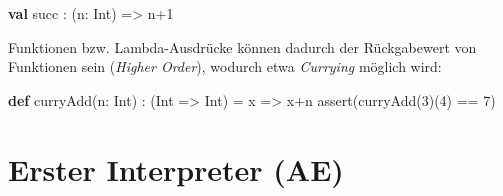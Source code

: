 \documentclass[]{article}
\newenvironment{Shaded}{}{}
\newcommand{\DecValTok}[1]{\textcolor[rgb]{0.25,0.63,0.44}{#1}}
\newcommand{\FunctionTok}[1]{\textcolor[rgb]{0.02,0.16,0.49}{#1}}
\newcommand{\KeywordTok}[1]{\textcolor[rgb]{0.00,0.44,0.13}{\textbf{#1}}}
\newcommand{\NormalTok}[1]{#1}
\begin{document}
\begin{Shaded}
\begin{Highlighting}[]
\KeywordTok{val}\NormalTok{ succ : (n: Int) =\textgreater{} n+}\DecValTok{1}
\end{Highlighting}
\end{Shaded}

Funktionen bzw. Lambda-Ausdrücke können dadurch der Rückgabewert von
Funktionen sein (\emph{Higher Order}), wodurch etwa \emph{Currying}
möglich wird:

\begin{Shaded}
\begin{Highlighting}[]
\KeywordTok{def} \FunctionTok{curryAdd}\NormalTok{(n: Int) : (Int =\textgreater{} Int) = x =\textgreater{} x+n}
\FunctionTok{assert}\NormalTok{(}\FunctionTok{curryAdd}\NormalTok{(}\DecValTok{3}\NormalTok{)(}\DecValTok{4}\NormalTok{) == }\DecValTok{7}\NormalTok{)}
\end{Highlighting}
\end{Shaded}


\section{Erster Interpreter (AE)} \label{erster-interpreter-ae}
\end{document}
